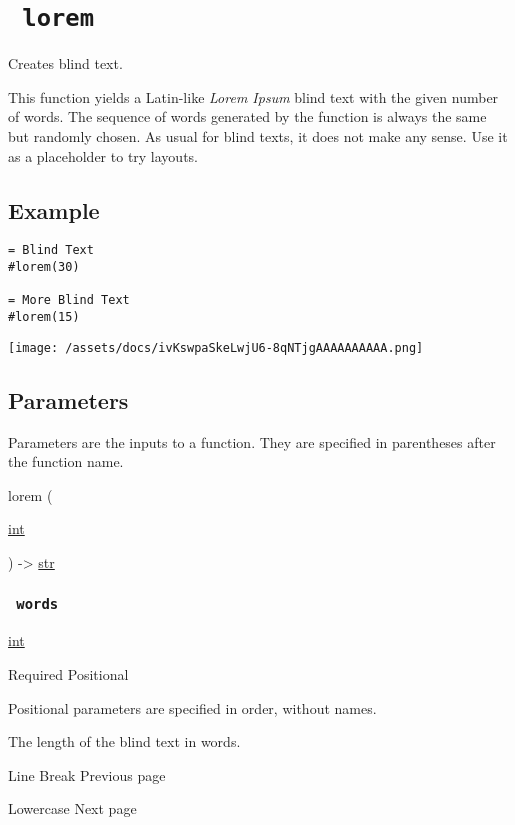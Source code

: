 \section{\texorpdfstring{\texttt{\ lorem\ }}{ lorem }}\label{summary}

Creates blind text.

This function yields a Latin-like \emph{Lorem Ipsum} blind text with the
given number of words. The sequence of words generated by the function
is always the same but randomly chosen. As usual for blind texts, it
does not make any sense. Use it as a placeholder to try layouts.

\subsection{Example}\label{example}

\begin{verbatim}
= Blind Text
#lorem(30)

= More Blind Text
#lorem(15)
\end{verbatim}

\texttt{[image: /assets/docs/ivKswpaSkeLwjU6-8qNTjgAAAAAAAAAA.png]}

\subsection{\texorpdfstring{{ Parameters
}}{ Parameters }}\label{parameters}

\label{parameters-tooltip}
Parameters are the inputs to a function. They are specified in
parentheses after the function name.

{ lorem } (

{ \href{/docs/reference/foundations/int/}{int} }

) -\textgreater{} \href{/docs/reference/foundations/str/}{str}

\subsubsection{\texorpdfstring{\texttt{\ words\ }}{ words }}\label{parameters-words}

\href{/docs/reference/foundations/int/}{int}

{Required} {{ Positional }}

\label{parameters-words-positional-tooltip}
Positional parameters are specified in order, without names.

The length of the blind text in words.

\href{/docs/reference/text/linebreak/}{\pandocbounded{}}

{ Line Break } { Previous page }

\href{/docs/reference/text/lower/}{\pandocbounded{}}

{ Lowercase } { Next page }


